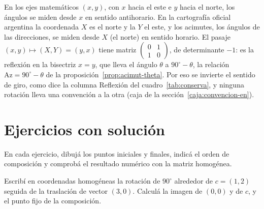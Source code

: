 \begin{idea}
En los ejes matemáticos \((x,y)\), con \(x\) hacia el este e \(y\) hacia el norte, los ángulos
se miden desde \(x\) en sentido antihorario. En la cartografía oficial argentina la coordenada
\(X\) es el norte y la \(Y\) el este, y los acimutes, los ángulos de las direcciones, se miden
desde \(X\) (el norte) en sentido horario. El pasaje
\((x,y)\mapsto(X,Y)=(y,x)\) tiene matriz
\(\left(\begin{smallmatrix}0&1\\1&0\end{smallmatrix}\right)\), de determinante \(-1\): es la
reflexión en la bisectriz \(x=y\), que lleva el ángulo \(\theta\) a \(90^\circ-\theta\), la
relación \(\mathrm{Az}=90^\circ-\theta\) de la proposición~\ref{prop:acimut-theta}. Por eso se
invierte el sentido de giro, como dice la columna Reflexión del cuadro~\ref{tab:conserva}, y
ninguna rotación lleva una convención a la otra (caja de la sección~\ref{caja:convencion-en}).
\end{idea}


\section{Ejercicios con solución}

En cada ejercicio, dibujá los puntos iniciales y finales, indicá el orden de composición y
comprobá el resultado numérico con la matriz homogénea.

\begin{ejercicio}
Escribí en coordenadas homogéneas la rotación de \(90^\circ\) alrededor de \(c=(1,2)\)
seguida de la traslación de vector \((3,0)\). Calculá la imagen de \((0,0)\) y de \(c\), y el
punto fijo de la composición.
\end{ejercicio}


